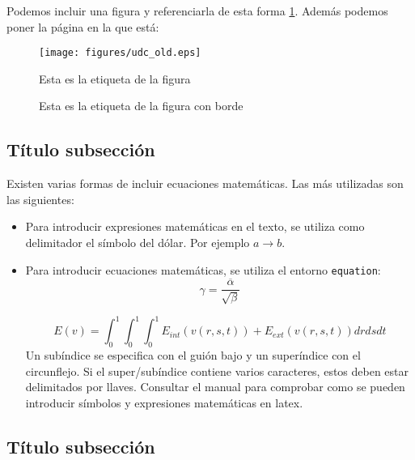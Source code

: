 Podemos incluir una figura y referenciarla de esta forma \ref{fig:logo}. Además podemos poner la página en la que está: \pageref{fig:logo}

\begin{figure}[htp]
\begin{center}
\texttt{[image: figures/udc\_old.eps]}
\caption{Esta es la etiqueta de la figura}
\label{fig:logo}
\end{center}
\end{figure}


\begin{figure}[htp]
\begin{center}
\caption{Esta es la etiqueta de la figura con borde}
\label{fig:logo2}
\end{center}
\end{figure}


\subsection{Título subsección}

Existen varias formas de incluir ecuaciones matemáticas. Las más utilizadas son las siguientes:
\begin{itemize}
 \item Para introducir expresiones matemáticas en el texto, se utiliza como delimitador el símbolo del dólar. Por ejemplo $a \rightarrow b$.
 \item Para introducir ecuaciones matemáticas, se utiliza el entorno \texttt{equation}:
\begin{equation}
 \gamma = \frac{\overline{\alpha}}{\sqrt{\beta}}
\label{eq:equation_example_1}
\end{equation}

\begin{equation}
E(v) =  \int^1_0 \int^1_0 \int^1_0 E_{int}(v(r,s,t)) + E_{ext}(v(r,s,t))drdsdt 
\label{eq:equation_example_2}
\end{equation}	
Un subíndice se especifica con el guión bajo y un superíndice con el circunflejo. Si el super/subíndice contiene varios caracteres, estos deben estar delimitados por llaves. Consultar el manual para comprobar como se pueden introducir símbolos y expresiones matemáticas en latex.
\end{itemize}



\subsection{Título subsección}

